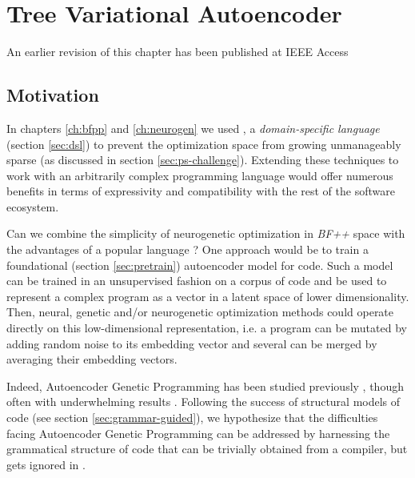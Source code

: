 \chapter{Tree Variational Autoencoder}\label{ch:tree2tree}
\begin{remark}
    An earlier revision of this chapter \cite{liventsevTreeVariationalAutoencoder2025} has been published at IEEE Access
\end{remark}

\section{Motivation}

In chapters \ref{ch:bfpp} and \ref{ch:neurogen} we used , a \emph{domain-specific language} (section \ref{sec:dsl}) to prevent the optimization space from growing unmanageably sparse (as discussed in section \ref{sec:ps-challenge}).
Extending these techniques to work with an arbitrarily complex programming language would offer numerous benefits in terms of expressivity and compatibility with the rest of the software ecosystem.

Can we combine the simplicity of neurogenetic optimization in \emph{BF++} space with the advantages of a popular language \cite{tiobeTiobeIndex2017}?
One approach would be to train a foundational (section \ref{sec:pretrain}) autoencoder \cite{bankAutoencoders2020} model for code.
Such a model can be trained in an unsupervised fashion on a corpus of code and be used to represent a complex program as a vector in a latent space of lower dimensionality.
Then, neural, genetic and/or neurogenetic optimization methods could operate directly on this low-dimensional representation, i.e. a program can be mutated by adding random noise to its embedding vector and several can be merged by averaging their embedding vectors.

Indeed, Autoencoder Genetic Programming has been studied previously \cite{wittenbergDenoisingAutoencoderGenetic2023,liskowskiProgramSynthesisLatent2020}, though often with underwhelming results \cite{mcdermottWhyAutoencodingDifficult2019}.
Following the success of structural models of code (see section \ref{sec:grammar-guided}), we hypothesize that the difficulties facing Autoencoder Genetic Programming can be addressed by harnessing the grammatical structure of code that can be trivially obtained from a compiler, but gets ignored in \cite{wittenbergDenoisingAutoencoderGenetic2023,liskowskiProgramSynthesisLatent2020,mcdermottWhyAutoencodingDifficult2019}.

